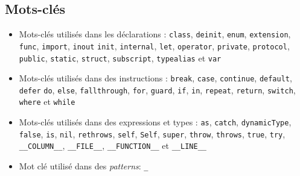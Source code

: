 \subsection{Mots-clés}

\begin{itemize}

\item Mots-clés utilisés dans les déclarations :
\texttt{class},
\texttt{deinit},
\texttt{enum},
\texttt{extension},
\texttt{func},
\texttt{import},
\texttt{inout}
\texttt{init},
\texttt{internal},
\texttt{let},
\texttt{operator},
\texttt{private},
\texttt{protocol},
\texttt{public},
\texttt{static},
\texttt{struct},
\texttt{subscript},
\texttt{typealias} et
\texttt{var}

\item Mots-clés utilisés dans des instructions :
\texttt{break},
\texttt{case},
\texttt{continue},
\texttt{default},
\texttt{defer}
\texttt{do},
\texttt{else},
\texttt{fallthrough},
\texttt{for},
\texttt{guard},
\texttt{if},
\texttt{in},
\texttt{repeat},
\texttt{return},
\texttt{switch},
\texttt{where} et
\texttt{while}

\item Mots-clés utilisés dans des expressions et types :
\texttt{as},
\texttt{catch},
\texttt{dynamicType},
\texttt{false},
\texttt{is},
\texttt{nil},
\texttt{rethrows},
\texttt{self},
\texttt{Self},
\texttt{super},
\texttt{throw},
\texttt{throws},
\texttt{true},
\texttt{try},
\texttt{__COLUMN__},
\texttt{__FILE__},
\texttt{__FUNCTION__} et
\texttt{__LINE__}

\item Mot clé utilisé dans des \emph{patterns}:
\texttt{_}


\end{itemize}
